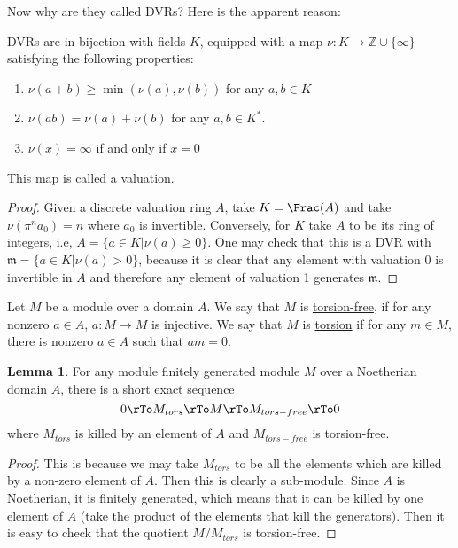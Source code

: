 \documentclass[12 pt]{article}
\theoremstyle{definition}
\newtheorem{lemma}[theorem]{Lemma}
\newcommand\zz{\mathbb{Z}}
\begin{document}
Now why are they called DVRs? Here is the apparent reason:
\begin{proposition}
DVRs are in bijection with fields $K$, equipped with a map $\nu:K \to \zz \cup \{\infty\}$ satisfying the following properties:
\begin{enumerate}
\item $\nu(a+b) \geq \min(\nu(a), \nu(b))$ for any $a,b \in K$

\item $\nu(ab)=\nu(a)+\nu(b)$ for any $a,b \in K^*$.

\item $\nu(x)=\infty$ if and only if $x=0$
\end{enumerate}
This map is called a valuation.
\end{proposition}
\begin{proof} Given a discrete valuation ring $A$, take $K=\Frac(A)$ and take $\nu(\pi^na_0)=n$ where $a_0$ is invertible. Conversely, for $K$ take $A$ to be its ring of integers, i.e, $A=\{a \in K| \nu(a) \geq 0\}$. One may check that this is a DVR with $\mathfrak{m}=\{a \in K| \nu(a)>0\}$, because it is clear that any element with valuation 0 is invertible in $A$ and therefore any element of valuation 1 generates $\mathfrak{m}$.
\end{proof}

\begin{definition} Let $M$ be a module over a domain $A$. We say that $M$ is \underline{torsion-free}, if for any nonzero $a \in A$, $a:M \to M$ is injective. We say that $M$ is \underline{torsion} if for any $m \in M$, there is nonzero $a \in A$ such that $am=0$.
\end{definition}

\begin{lemma} For any module finitely generated module $M$ over a Noetherian domain $A$, there is a short exact sequence
\[0 \rTo M_{tors} \rTo M \rTo M_{tors-free} \rTo 0\]
where $M_{tors}$ is killed by an element of $A$ and $M_{tors-free}$ is torsion-free.
\label{tors tors-free ses}
\end{lemma}
\begin{proof} This is because we may take $M_{tors}$ to be all the elements which are killed by a non-zero element of $A$. Then this is clearly a sub-module. Since $A$ is Noetherian, it is finitely generated, which means that it can be killed by one element of $A$ (take the product of the elements that kill the generators). Then it is easy to check that the quotient $M/M_{tors}$ is torsion-free.
\end{proof}
\end{document}
